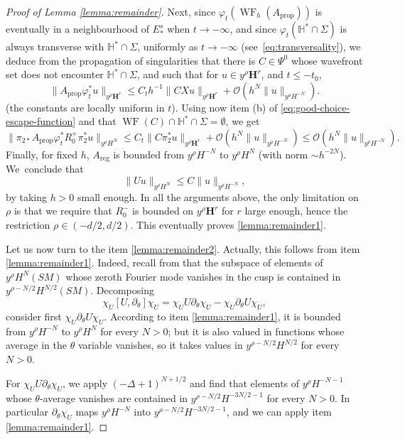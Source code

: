 \documentclass[10pt]{amsart}
\newcommand{\bH}{\boldsymbol{H}}
\newcommand{\HH}{\mathbb{H}}
\DeclareMathOperator{\WF}{WF}
\theoremstyle{plain}
\theoremstyle{definition}
\begin{document}
\begin{proof}[Proof of Lemma \ref{lemma:remainder}]
Next, since $\varphi_t(\WF_h(A_\mathrm{prop}))$ is eventually in a neighbourhood of $E^s_*$ when $t\to -\infty$, and since $\varphi_{t}(\HH^\ast\cap\Sigma)$ is always transverse with $\HH^\ast \cap \Sigma$, uniformly as $t\to -\infty$ (see~\eqref{eq:transversality}), we deduce from the propagation of singularities \cite[Prop.\,A.21 \& A.23]{Bonthonneau-Weich-17} that there is $C\in \Psi^0$ whose wavefront set does not encounter $\HH^\ast \cap \Sigma$, and such that for $u \in y^\rho \bH^r$, and $t\leq - t_0$,
\[
\| A_\mathrm{prop} \varphi_t^\ast u \|_{y^\rho \bH^r} \leq C_t h^{-1} \| C X u \|_{y^\rho \bH^r} + \mathcal{O}(h^N \| u \|_{y^\rho H^{-N}}).
\]
(the constants are locally uniform in $t$). Using now item (b) of \eqref{eq:good-choice-escape-function} and that $\WF(C)\cap\mathbb{H}^\ast \cap \Sigma= \emptyset$, we get
\[
\| \pi_{2\ast} A_\mathrm{prop} \varphi_t^\ast R_0^+ \pi_2^\ast u \|_{y^\rho H^{N}} \leq C_t \| C \pi_2^\ast u \|_{y^\rho \bH^r} + \mathcal{O}(h^N \| u \|_{y^\rho H^{-N}}) \leq \mathcal{O}(h^N \| u\|_{y^\rho H^{-N}}).
\]
Finally, for fixed $h$, $A_\mathrm{reg}$ is bounded from $y^\rho H^{-N}$ to $y^\rho H^{N}$ (with norm $\sim h^{-2N}$). We~conclude that
\[
\| U u \|_{y^\rho H^{N}} \leq C \| u \|_{y^\rho H^{-N}},
\]
by taking $h>0$ small enough. In all the arguments above, the only limitation on $\rho$ is that we require that $R_0^-$ is bounded on $y^\rho \bH^r$ for $r$ large enough, hence the restriction $\rho \in (-d/2, d/2)$. This eventually proves \eqref{lemma:remainder1}.

Let us now turn to the item \eqref{lemma:remainder2}. Actually, this follows from item \eqref{lemma:remainder1}. Indeed, recall from \cite[Lem.\,4.3]{Bonthonneau-Lefeuvre-19-1} that the subspace of elements of $y^{\rho}H^N(SM)$ whose zeroth Fourier mode vanishes in the cusp is contained in $y^{\rho-N/2} H^{N/2}(SM)$. Decomposing
\[
\chi_U [U,\partial_\theta]\chi_U= \chi_U U\partial_\theta \chi_U - \chi_U \partial_\theta U \chi_U,
\]
consider first $\chi_U\partial_\theta U\chi_U$. According to item \eqref{lemma:remainder1}, it is bounded from $y^\rho H^{-N}$ to $y^\rho H^N$ for every $N>0$; but it is also valued in functions whose average in the $\theta$ variable vanishes, so it takes values in $y^{\rho-N/2} H^{N/2}$ for every $N>0$.

For $\chi_U U\partial_\theta \chi_U$, we apply $(-\Delta+1)^{N+1/2}$ and find that elements of $y^{\rho} H^{-N-1}$ whose $\theta$-average vanishes are contained in $y^{\rho-N/2} H^{-3N/2-1}$ for every $N>0$. In particular $\partial_\theta \chi_U$ maps $y^\rho H^{-N}$ into $y^{\rho-N/2} H^{-3N/2-1}$, and we can apply item \eqref{lemma:remainder1}.


\end{proof}
\end{document}

